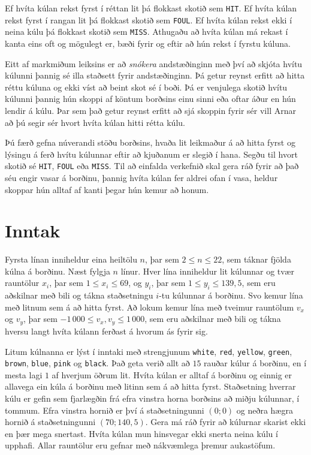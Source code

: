 Ef hvíta kúlan rekst fyrst í réttan lit þá flokkast skotið sem \texttt{HIT}.
Ef hvíta kúlan rekst fyrst í rangan lit þá flokkast skotið sem \texttt{FOUL}.
Ef hvíta kúlan rekst ekki í neina kúlu þá flokkast skotið sem \texttt{MISS}.
Athugaðu að hvíta kúlan má rekast í kanta eins oft og mögulegt er, bæði fyrir og eftir að hún rekst í fyrstu kúluna.

Eitt af markmiðum leiksins er að \emph{snókera} andstæðinginn með því að skjóta hvítu kúlunni þannig sé illa staðsett fyrir andstæðinginn.
Þá getur reynst erfitt að hitta réttu kúluna og ekki víst að beint skot sé í boði.
Þá er venjulega skotið hvítu kúlunni þannig hún skoppi af köntum borðsins einu sinni eða oftar áður en hún lendir á kúlu.
Þar sem það getur reynst erfitt að sjá skoppin fyrir sér vill Arnar að þú segir sér hvort hvíta kúlan hitti rétta kúlu.

Þú færð gefna núverandi stöðu borðsins, hvaða lit leikmaður á að hitta fyrst og lýsingu á ferð hvítu kúlunnar eftir að kjuðanum er slegið í hana.
Segðu til hvort skotið sé \texttt{HIT}, \texttt{FOUL} eða \texttt{MISS}.
Til að einfalda verkefnið skal gera ráð fyrir að það séu engir vasar á borðinu, þannig hvíta kúlan fer aldrei ofan í vasa, heldur skoppar hún alltaf af kanti þegar hún kemur að honum.

\section*{Inntak}
Fyrsta línan inniheldur eina heiltölu $n$, þar sem $2 \leq n \leq 22$, sem táknar fjölda kúlna á borðinu.
Næst fylgja $n$ línur.
Hver lína inniheldur lit kúlunnar og tvær rauntölur $x_i$, þar sem $1 \leq x_i \leq 69$, og $y_i$, þar sem $1 \leq y_i \leq 139{,}5$, sem eru aðskilnar með bili og tákna staðsetningu $i$-tu kúlunnar á borðinu.
Svo kemur lína með litnum sem á að hitta fyrst.
Að lokum kemur lína með tveimur rauntölum $v_x$ og $v_y$, þar sem $-1\,000 \leq v_x, v_y \leq 1\,000$, sem eru aðskilnar með bili og tákna hversu langt hvíta kúlann ferðast á hvorum ás fyrir sig.

Litum kúlnanna er lýst í inntaki með strengjunum \texttt{white}, \texttt{red}, \texttt{yellow}, \texttt{green}, \texttt{brown}, \texttt{blue}, \texttt{pink} og \texttt{black}.
Það geta verið allt að $15$ rauðar kúlur á borðinu, en í mesta lagi $1$ af hverjum öðrum lit.
Hvíta kúlan er alltaf á borðinu og einnig er allavega ein kúla á borðinu með litinn sem á að hitta fyrst.
Staðsetning hverrar kúlu er gefin sem fjarlægðin frá efra vinstra horna borðsins að miðju kúlunnar, í tommum.
Efra vinstra hornið er því á staðsetningunni $(0; 0)$ og neðra hægra hornið á staðsetningunni $(70; 140{,}5)$.
Gera má ráð fyrir að kúlurnar skarist ekki en þær mega snertast.
Hvíta kúlan mun hinsvegar ekki snerta neina kúlu í upphafi.
Allar rauntölur eru gefnar með nákvæmlega þremur aukastöfum.

